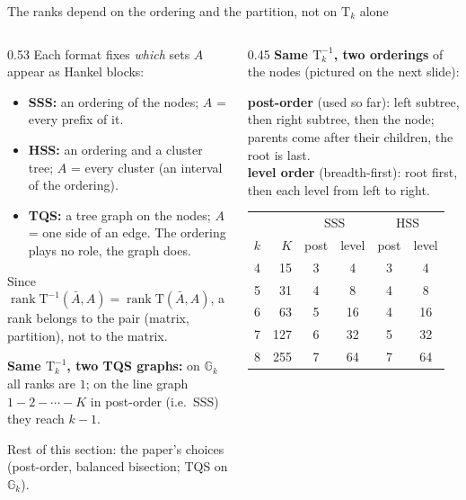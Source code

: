 \documentclass[aspectratio=169,11pt]{beamer}
\begin{document}
\begin{frame}{The ranks depend on the ordering and the partition, not on $\mathrm{T}_k$ alone}
\begin{columns}[T]
\begin{column}{0.53\textwidth}
\footnotesize
Each format fixes \emph{which} sets $A$ appear as Hankel blocks:
\begin{itemize}
\item \textbf{SSS:} an ordering of the nodes; $A$ = every prefix of it.
\item \textbf{HSS:} an ordering and a cluster tree; $A$ = every cluster (an interval of the ordering).
\item \textbf{TQS:} a tree graph on the nodes; $A$ = one side of an edge. The ordering plays no role, the graph does.
\end{itemize}
Since $\operatorname{rank}\mathrm{T}^{-1}(\bar{A},A)=\operatorname{rank}\mathrm{T}(\bar{A},A)$, a rank belongs to the
pair (matrix, partition), not to the matrix.

\vspace{2mm}
\textbf{Same $\mathrm{T}_k^{-1}$, two TQS graphs:} on $\mathbb{G}_k$ all ranks are $1$; on the line graph
$1-2-\cdots-K$ in post-order (i.e.\ SSS) they reach $k-1$.

\vspace{2mm}
\alert{Rest of this section:} the paper's choices (post-order, balanced bisection; TQS on $\mathbb{G}_k$).
\end{column}
\begin{column}{0.45\textwidth}
\footnotesize
\textbf{Same $\mathrm{T}_k^{-1}$, two orderings} of the nodes (pictured on the next slide):

\vspace{1mm}
\raggedright
\scriptsize
\textbf{post-order} (used so far): left subtree, then right subtree, then the node; parents come after their
children, the root is last.\\
\textbf{level order} (breadth-first): root first, then each level from left to right.

\vspace{1mm}
\centering
\footnotesize
\renewcommand{\arraystretch}{1.0}
\begin{tabular}{rr|cc|cc}
\toprule
 & & \multicolumn{2}{c|}{SSS} & \multicolumn{2}{c}{HSS} \\
$k$ & $K$ & post & level & post & level \\
\midrule
4 & 15 & 3 & 4 & 3 & 4 \\
5 & 31 & 4 & 8 & 4 & 8 \\
6 & 63 & 5 & 16 & 4 & 16 \\
7 & 127 & 6 & 32 & 5 & 32 \\
8 & 255 & 7 & 64 & 7 & 64 \\
\bottomrule
\end{tabular}


\end{column}
\end{columns}
\end{frame}
\end{document}
